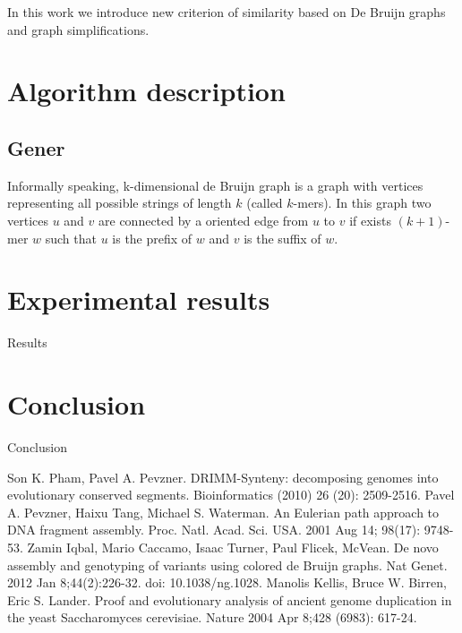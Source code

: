 \documentclass[a4paper,12pt]{scrartcl}
\begin{document}
In this work we introduce new criterion of similarity based on De Bruijn graphs and graph simplifications.


\section{Algorithm description}
\subsection{Gener}
Informally speaking, k-dimensional de Bruijn graph is a graph with vertices representing all possible strings of length \(k\)
(called \(k\)-mers). In this graph two vertices \(u\) and \(v\) are connected by a oriented edge from \(u\) to \(v\) if exists
\((k + 1)\)-mer \(w\) such that \(u\) is the prefix of \(w\) and \(v\) is the suffix of \(w\).

\section{Experimental results}
Results
\section{Conclusion}
Conclusion

\begin{thebibliography}{9}
	Son K. Pham, Pavel A. Pevzner.
	DRIMM-Synteny: decomposing genomes into evolutionary conserved segments.
	Bioinformatics (2010)  26  (20):  2509-2516.
	Pavel A. Pevzner, Haixu Tang, Michael S. Waterman.
	An Eulerian path approach to DNA fragment assembly.
	Proc. Natl. Acad. Sci. USA. 2001 Aug 14; 98(17): 9748-53.
	Zamin Iqbal, Mario Caccamo, Isaac Turner, Paul Flicek, McVean.
	De novo assembly and genotyping of variants using colored de Bruijn graphs.
	Nat Genet. 2012 Jan 8;44(2):226-32. doi: 10.1038/ng.1028.
	Manolis Kellis, Bruce W. Birren, Eric S. Lander.
	Proof and evolutionary analysis of ancient genome duplication in the yeast Saccharomyces cerevisiae.
	Nature 2004 Apr 8;428 (6983): 617-24.
\end{thebibliography}
\end{document}
